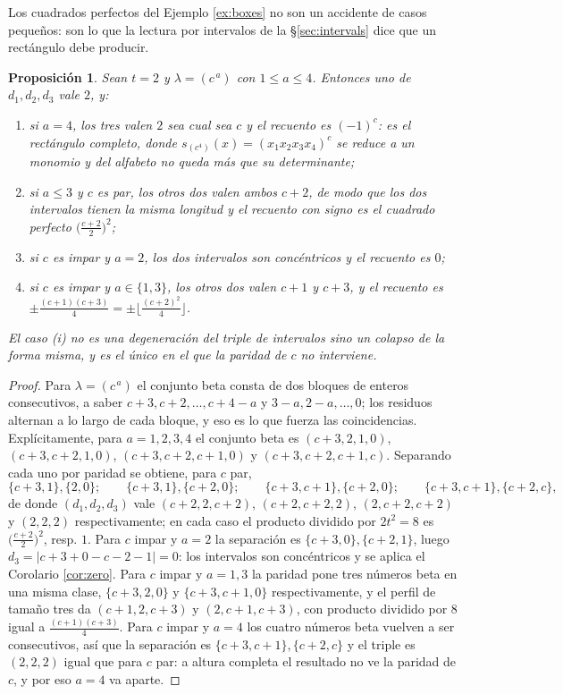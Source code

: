 \documentclass[11pt,reqno]{amsart}
\theoremstyle{plain}
\newtheorem{proposition}[theorem]{Proposición}
\theoremstyle{definition}
\begin{document}
Los cuadrados perfectos del Ejemplo \ref{ex:boxes} no son un accidente de casos pequeños: son lo que
la lectura por intervalos de la \S\ref{sec:intervals} dice que un rectángulo debe producir.

\begin{proposition}\label{prop:rect}
Sean $t=2$ y $\lambda=(c^{\,a})$ con $1\le a\le4$. Entonces uno de $d_1,d_2,d_3$ vale $2$, y:
\begin{enumerate}
\item[\rm(i)] si $a=4$, los tres valen $2$ sea cual sea $c$ y el recuento es $(-1)^c$: es el
rectángulo completo, donde $s_{(c^4)}(x)=(x_1x_2x_3x_4)^{c}$ se reduce a un monomio y del alfabeto no
queda más que su determinante;
\item[\rm(ii)] si $a\le3$ y $c$ es par, los otros dos valen ambos $c+2$, de modo que los dos
intervalos tienen \emph{la misma longitud} y el recuento con signo es el cuadrado perfecto
$\bigl(\tfrac{c+2}{2}\bigr)^2$;
\item[\rm(iii)] si $c$ es impar y $a=2$, los dos intervalos son \emph{concéntricos} y el recuento es
$0$;
\item[\rm(iv)] si $c$ es impar y $a\in\{1,3\}$, los otros dos valen $c+1$ y $c+3$, y el recuento es
$\pm\tfrac{(c+1)(c+3)}{4}=\pm\bigl\lfloor\tfrac{(c+2)^2}{4}\bigr\rfloor$.
\end{enumerate}
El caso {\rm(i)} no es una degeneración del triple de intervalos sino un colapso de la forma misma, y
es el único en el que la paridad de $c$ no interviene.
\end{proposition}

\begin{proof}
Para $\lambda=(c^{\,a})$ el conjunto beta consta de dos bloques de enteros consecutivos, a saber
$c+3,c+2,\dots,c+4-a$ y $3-a,2-a,\dots,0$; los residuos alternan a lo largo de cada bloque, y eso es
lo que fuerza las coincidencias. Explícitamente, para $a=1,2,3,4$ el conjunto beta es $(c+3,2,1,0)$,
$(c+3,c+2,1,0)$, $(c+3,c+2,c+1,0)$ y $(c+3,c+2,c+1,c)$. Separando cada uno por paridad se obtiene,
para $c$ par,
\[
\{c{+}3,1\},\{2,0\};\qquad \{c{+}3,1\},\{c{+}2,0\};\qquad \{c{+}3,c{+}1\},\{c{+}2,0\};\qquad
\{c{+}3,c{+}1\},\{c{+}2,c\},
\]
de donde $(d_1,d_2,d_3)$ vale $(c{+}2,2,c{+}2)$, $(c{+}2,c{+}2,2)$, $(2,c{+}2,c{+}2)$ y $(2,2,2)$
respectivamente; en cada caso el producto dividido por $2t^2=8$ es $\bigl(\tfrac{c+2}{2}\bigr)^2$,
resp. $1$. Para $c$ impar y $a=2$ la separación es $\{c{+}3,0\},\{c{+}2,1\}$, luego
$d_3=|c{+}3+0-c{-}2-1|=0$: los intervalos son concéntricos y se aplica el Corolario \ref{cor:zero}.
Para $c$ impar y $a=1,3$ la paridad pone tres números beta en una misma clase, $\{c{+}3,2,0\}$ y
$\{c{+}3,c{+}1,0\}$ respectivamente, y el perfil de tamaño tres da $(c{+}1,2,c{+}3)$ y
$(2,c{+}1,c{+}3)$, con producto dividido por $8$ igual a $\tfrac{(c+1)(c+3)}{4}$. Para $c$ impar y
$a=4$ los cuatro números beta vuelven a ser consecutivos, así que la separación es
$\{c{+}3,c{+}1\},\{c{+}2,c\}$ y el triple es $(2,2,2)$ igual que para $c$ par: a altura completa el
resultado no ve la paridad de $c$, y por eso $a=4$ va aparte.
\end{proof}
\end{document}
